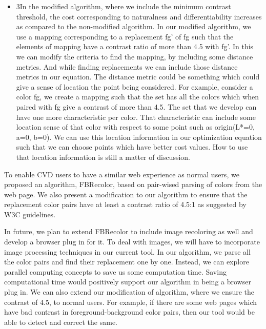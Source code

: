 \begin{itemize}
\item{3}In the modified algorithm, where we include the minimum contrast threshold, the cost corresponding to naturalness and differentiability increases as compared to the non-modified algorithm. In our modified algorithm, we use a mapping corresponding to a replacement fg’ of fg such that the elements of mapping have a contrast ratio of more than 4.5 with fg’. In this we can modify the criteria to find the mapping, by including some distance metrics. And while finding replacements we can include those distance metrics in our equation. The distance metric could be something which could give a sense of location the point being considered. For example, consider a color fg, we create a mapping such that the set has all the colors which when paired with fg give a contrast of more than 4.5. The set that we develop can have one more characteristic per color. That characteristic can include some location sense of that color with respect to some point such as origin(L*=0, a=0, b=0). We can use this location information in our optimization equation such that we can choose points which have better cost values. How to use that location information is still a matter of discussion. 

\end{itemize}


To enable CVD users to have a similar web experience as normal users, we proposed an algorithm, FBRecolor,  based on pair-wised parsing of colors from the web page. We also present a modification to our algorithm to ensure that the replacement color pairs have at least a contrast ratio of 4.5:1 as suggested by W3C guidelines.

In future, we plan to extend FBRecolor to include image recoloring as well and develop a browser plug in for it. To deal with images, we will have to incorporate image processing techniques in our current tool. In our algorithm, we parse all the color pairs and find their replacement one by one. Instead, we can explore parallel computing concepts to save us some computation time. Saving computational time would positively support our algorithm in being a browser plug in. We can also extend our modification of algorithm, where we ensure the contrast of 4.5, to normal users. For example, if there are some web pages which have bad contrast in foreground-background color pairs, then our tool would be able to detect and correct the same.   